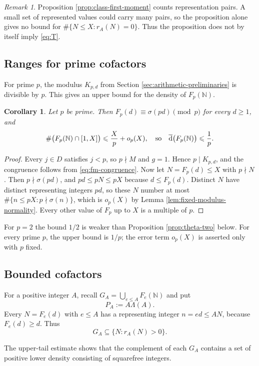 \documentclass[11pt,letterpaper,reqno]{amsart}
\numberwithin{equation}{section}
\newtheorem{corollary}[theorem]{Corollary}
\theoremstyle{remark}
\newtheorem{remark}[theorem]{Remark}
\newcommand{\N}{\mathbb{N}}
\newcommand{\upperdens}{\overline{\textup{d}}}
\renewcommand{\leq}{\leqslant}
\renewcommand{\geq}{\geqslant}
\begin{document}
\begin{remark}
Proposition \ref{prop:class-first-moment} counts representation pairs. A small set
of represented values could carry many pairs, so the proposition alone gives no bound
for $\#\{N\leq X:r_A(N)=0\}$. Thus the proposition does not by itself imply
\eqref{eq:T}.
\end{remark}

\subsection{Ranges for prime cofactors}

For prime $p$, the modulus $K_{p,d}$ from
Section \ref{sec:arithmetic-preliminaries} is divisible by $p$.
This gives an upper bound for the density of $F_p(\N)$.
\begin{corollary}
Let $p$ be prime. Then $F_p(d)\equiv\sigma(pd)\pmod p$ for every $d\geq1$,
and
\[
 \#\bigl(F_p(\N)\cap[1,X]\bigr)\leq\frac Xp+o_p(X),
 \quad\text{so}\quad
 \upperdens\bigl(F_p(\N)\bigr)\leq\frac1p .
\]
\end{corollary}
\begin{proof}
Every $j\in D$ satisfies $j<p$, so $p\nmid M$ and $g=1$. Hence
$p\mid K_{p,d}$, and the congruence follows from \eqref{eq:fm-congruence}.
Now let $N=F_p(d)\leq X$ with $p\nmid N$. Then $p\nmid\sigma(pd)$, and
$pd\leq pN\leq pX$ because $d\leq F_p(d)$. Distinct $N$ have distinct
representing integers $pd$, so these $N$ number at most
$\#\{n\leq pX:p\nmid\sigma(n)\}$, which is $o_p(X)$ by
Lemma \ref{lem:fixed-modulus-normality}. Every other value of $F_p$ up to
$X$ is a multiple of $p$.
\end{proof}
For $p=2$ the bound $1/2$ is weaker than Proposition \ref{prop:theta-two}
below. For every prime $p$, the upper bound is $1/p$; the error term
$o_p(X)$ is asserted only with $p$ fixed.

\subsection{Bounded cofactors}

For a positive integer $A$, recall $G_A=\bigcup_{e\leq A}F_e(\N)$ and put
\[
 P_A:=A\Lambda(A).
\]
Every $N=F_e(d)$ with
$e\leq A$ has a representing integer $n=ed\leq AN$, because $F_e(d)\geq d$.
Thus
\[
 G_A\subseteq\{N:r_A(N)>0\}.
\]

The upper-tail estimate shows that the complement of each $G_A$ contains a set of positive lower density consisting of squarefree integers.
\end{document}
